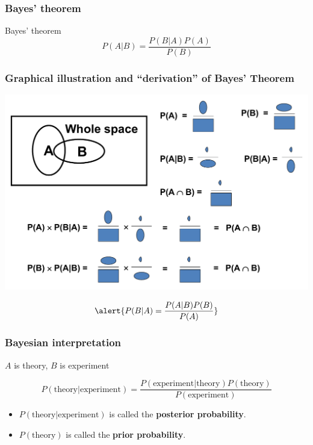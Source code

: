 \documentclass[9pt]{beamer}
\newif\ifmynote
\newcommand\mynote[1]{%
\ifmynote \textbf{#1} \else \fi
}
\begin{document}
\begin{frame}
 \frametitle{Bayes' theorem}
 
 \mynote{Écrire au tableau}
 
 \begin{block}{Bayes' theorem}
  $$P(A|B) = \frac{P(B|A) P(A)}{P(B)}$$
 \end{block}

\end{frame}


\begin{frame}
 \frametitle{Graphical illustration and ``derivation'' of Bayes' Theorem}
 \vspace{-5pt}
 
 \includegraphics[width=\textwidth]{BayesTheorem.png}
 
 \begin{large}$$\alert{P(B|A) = \frac{P(A|B) P(B)}{P(A)}}$$                                              \end{large}
\end{frame}

\begin{frame}
 \frametitle{Bayesian interpretation}
 
 $A$ is theory, $B$ is experiment
 
 $$P(\text{theory} | \text{experiment}) = \frac{P(\text{experiment}|\text{theory}) P(\text{theory})}{P(\text{experiment})}$$
 
 \begin{itemize}
  \item $P(\text{theory} | \text{experiment})$ is called the \textbf{posterior probability}.
  \item $P(\text{theory})$ is called the \textbf{prior probability}.
 \end{itemize}

\end{frame}
\end{document}
